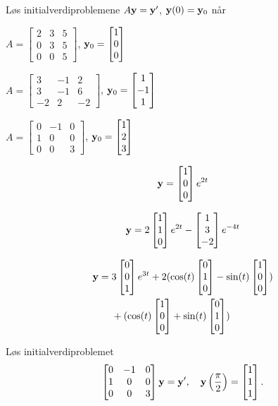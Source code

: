 \begin{oppgave}
Løs initialverdiproblemene $A\mathbf{y}= \mathbf{y} '$, $\mathbf{y}(0)=\mathbf{y}_0$ når 

\begin{punkt}
	$
	A=
	\begin{bmatrix}
	2 & 3 & 5\\
	0 & 3 & 5\\
	0 & 0 & 5
	\end{bmatrix}
	$, $
	\mathbf{y}_0=\begin{bmatrix} 1 \\ 0 \\ 0 \end{bmatrix}
	$
\end{punkt}
%
\begin{punkt}
	$
	A=
	\begin{bmatrix}
	3 & -1 & 2\\
	3 & -1 & 6\\
	-2 & 2 & -2
	\end{bmatrix}$, $
	\mathbf{y}_0=\begin{bmatrix} 1 \\ -1 \\ 1 \end{bmatrix}
	$
\end{punkt}

\begin{punkt}
	$
	A=
	\begin{bmatrix}
	0 & -1 & 0\\
	1 & 0 & 0\\
	0 & 0 & 3
	\end{bmatrix}$, $
	\mathbf{y}_0=\begin{bmatrix} 1 \\ 2 \\ 3 \end{bmatrix}
	$
\end{punkt}


\end{oppgave}

\begin{losning}


\begin{punkt}
	$$\mathbf{y}=\begin{bmatrix} 1 \\ 0 \\ 0 \end{bmatrix}e^{2t}$$
\end{punkt}

\begin{punkt}
	$$\mathbf{y}=2\begin{bmatrix} 1 \\ 1 \\ 0 \end{bmatrix}e^{2t}-\begin{bmatrix} 1 \\ 3 \\ -2 \end{bmatrix}e^{-4t}$$
\end{punkt}

\begin{punkt}
	$$	\begin{aligned}
	\mathbf{y}= {} & 3\begin{bmatrix} 0 \\ 0 \\ 1 \end{bmatrix}e^{3t}+2(\cos (t) \begin{bmatrix} 0 \\ 1 \\ 0 \end{bmatrix}-\sin (t) \begin{bmatrix} 1 \\ 0 \\ 0 \end{bmatrix})\\
	& +(\cos (t) \begin{bmatrix} 1 \\ 0 \\ 0 \end{bmatrix}+\sin (t) \begin{bmatrix} 0 \\ 1 \\ 0 \end{bmatrix})
	\end{aligned}$$
	
\end{punkt}


	

\end{losning}

\begin{oppgave}
Løs initialverdiproblemet $$
\begin{bmatrix}
0 & -1 & 0\\
1 & 0 & 0\\
0 & 0 & 3
\end{bmatrix}
\mathbf{y}=\mathbf{y}',\quad \mathbf{y}\left(\frac{\pi}{2}\right)=\begin{bmatrix} 1 \\ 1 \\ 1 \end{bmatrix}.
$$
\end{oppgave}

